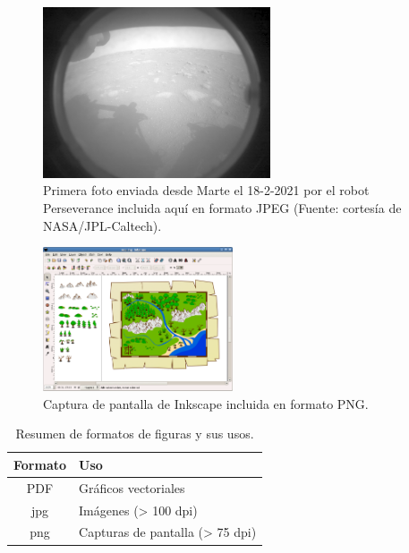 \documentclass[11pt,a4paper]{article}
\begin{document}
\begin{figure}[hbt]
	\centering
	\includegraphics[width=0.6\textwidth]{Mars_Perseverance} 
	\caption[Foto histórica enviada desde Marte]{Primera foto enviada desde Marte el {18-2-2021} por el robot Perseverance incluida aquí en formato JPEG (Fuente: cortesía de NASA/JPL-Caltech).}
	\label{fig:mars}
\end{figure}

\begin{figure}[hbt]
	\centering
	\includegraphics[width=0.5\textwidth]{../figs/inkscape} 
	\caption[Ejemplo de captura en png]{Captura de pantalla de \textsf{Inkscape} incluida en formato \textsf{PNG}.}
	\label{fig:inkscape}
\end{figure}


\begin{table}[hbt]
\centering
\caption{Resumen de formatos de figuras y sus usos.}\label{tab:formatos}
\begin{tabular}{c|l}
\textbf{Formato} & \textbf{Uso} \\
\hline
PDF & Gráficos vectoriales \\
jpg & Imágenes (> 100 dpi) \\
png & Capturas de pantalla (> 75 dpi) 
\end{tabular}
\end{table}
\end{document}
